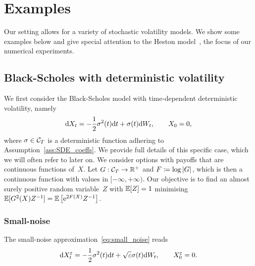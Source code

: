 \section{Examples}\label{sec:Examples}
Our setting allows for a variety of stochastic volatility models. 
We show some examples below
and give special attention to the Heston model~\cite{Heston1993AOptions}, the focus of our numerical experiments. 


\subsection{Black-Scholes with deterministic volatility}\label{sec:BS}
We first consider the Black-Scholes model with
time-dependent deterministic volatility, namely
$$
\mathrm{d} X_t = -\frac{1}{2}\sigma^2(t) \mathrm{d} t + \sigma(t) \mathrm{d} W_t, \qquad X_0 = 0,
$$
where $\sigma\in \mathcal{C}_T$ is a deterministic function adhering to Assumption~\ref{ass:SDE_coeffs}. 
We provide full details of this specific case, 
which we will often refer to later on.
We consider options with payoffs that are continuous functions of~$X$. 
Let $G:\mathcal{C}_{T}\rightarrow\mathbb{R}^+$ and $F \coloneqq \log|G|$, 
which is then a continuous function with values in $[-\infty,+\infty)$. %
Our objective is to find an almost surely positive random variable~$Z$ with $\mathbb{E}[Z] = 1$ minimising $\mathbb{E}[G^2(X)Z^{-1}] = \mathbb{E}\left[\mathrm{e}^{2F(X)}Z^{-1}\right]$.

\subsubsection{Small-noise}
The small-noise approximation~\eqref{eq:small_noise} reads
$$
\mathrm{d} X_t^{\varepsilon} = -\frac{1}{2}\sigma^2(t)\mathrm{d} t + \sqrt{\varepsilon}\sigma(t) \mathrm{d} W_t, \qquad X_0 ^{\varepsilon} = 0.
$$

